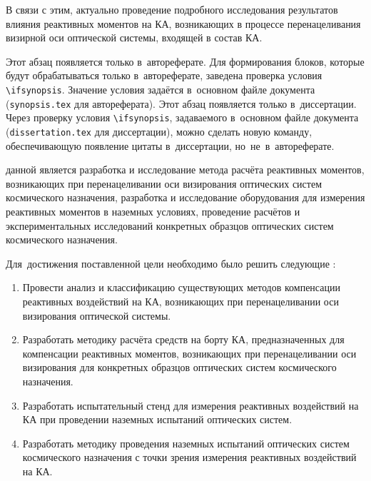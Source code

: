 В связи с этим, актуально проведение подробного исследования результатов влияния реактивных моментов на КА, возникающих в процессе перенацеливания визирной оси оптической системы, входящей в состав КА.


\ifsynopsis
Этот абзац появляется только в~автореферате.
Для формирования блоков, которые будут обрабатываться только в~автореферате,
заведена проверка условия \verb!\!\verb!ifsynopsis!.
Значение условия задаётся в~основном файле документа (\verb!synopsis.tex! для
автореферата).
\else
Этот абзац появляется только в~диссертации.
Через проверку условия \verb!\!\verb!ifsynopsis!, задаваемого в~основном файле
документа (\verb!dissertation.tex! для диссертации), можно сделать новую
команду, обеспечивающую появление цитаты в~диссертации, но~не~в~автореферате.
\fi


{\aim} данной является разработка и исследование метода расчёта реактивных моментов, возникающих при перенацеливании оси визирования оптических систем космического назначения, разработка и исследование оборудования для измерения реактивных моментов в наземных условиях, проведение расчётов и экспериментальных исследований конкретных образцов оптических систем космического назначения.

Для~достижения поставленной цели необходимо было решить следующие {\tasks}:
\begin{enumerate}[beginpenalty=10000] %
  \item Провести анализ и классификацию существующих методов компенсации реактивных воздействий на КА, возникающих при перенацеливании оси визирования оптической системы.
  \item Разработать методику расчёта средств на борту КА, предназначенных для компенсации реактивных моментов, возникающих при перенацеливании оси визирования для конкретных образцов оптических систем космического назначения.
  \item Разработать испытательный стенд для измерения реактивных воздействий на КА при проведении наземных испытаний оптических систем.
  \item Разработать методику проведения наземных испытаний оптических систем космического назначения с точки зрения измерения реактивных воздействий на КА.
\end{enumerate}


